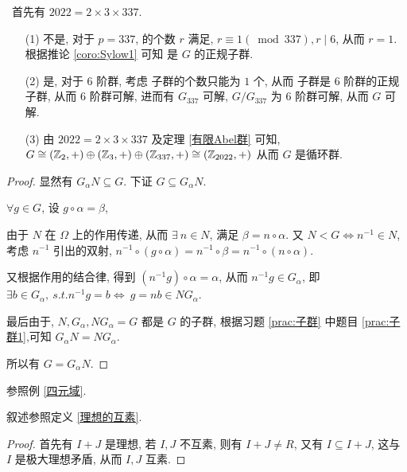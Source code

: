 \problem[题目 6]

\begin{solution}\
	首先有 $2022=2\times 3\times 337$.
	\begin{itemize}
		\item[(1)]不是, 对于 $p=337$, \Sy[337] 的个数 $r$ 满足, $r\equiv 1(\bmod 337),r\mid 6$, 从而 $r=1$. 根据推论 \ref{coro:Sylow1} 可知 \Sy[337] 是 $G$ 的正规子群.
		\item[(2)]是, 对于 $6$ 阶群, 考虑 \Sy[3] 子群的个数只能为 $1$ 个, 从而 \Sy[3] 子群是 $6$ 阶群的正规子群, 从而 $6$ 阶群可解, 进而有 $G_{337}$ 可解, $G/G_{337}$ 为 $6$ 阶群可解, 从而 $G$ 可解.
		\item[(3)] 由 $2022=2\times 3\times 337$ 及定理 \ref{有限Abel群} 可知, $G\cong (\mathbb Z_2,+)\oplus(\mathbb Z_3,+)\oplus(\mathbb Z_{337},+)\cong(\mathbb Z_{2022},+)$ 从而 $G$ 是循环群.
	\end{itemize}

\end{solution}


\problem[题目 7]

\begin{proof}
	显然有 $G_\alpha N\subseteq G$. 下证 $G\subseteq G_\alpha N$.

	$\forall g\in G$, 设 $g\circ \alpha = \beta$,

	由于 $N$ 在 $\Omega$ 上的作用传递, 从而 $\exists\ n\in N$, 满足 $\beta=n\circ \alpha$. 又 $N<G\Leftrightarrow n^{-1}\in N$, 考虑 $n^{-1}$ 引出的双射, $n^{-1}\circ(g\circ \alpha)=n^{-1}\circ \beta=n^{-1}\circ(n\circ \alpha)$.

	又根据作用的结合律, 得到 $(n^{-1}g)\circ \alpha=\alpha$, 从而 $n^{-1}g\in G_\alpha$, 即 $\exists b\in G_\alpha,\ s.t. n^{-1}g=b\Leftrightarrow\ g=nb\in  NG_\alpha$.

	最后由于, $N,G_\alpha,NG_\alpha=G$ 都是 $G$ 的子群, 根据习题 \ref{prac:子群} 中题目 \ref{prac:子群1},可知 $G_\alpha N=N G_\alpha$.

	所以有 $G=G_\alpha N$.

\end{proof}

\problem[题目 8]

\begin{solution}
	参照例 \ref{四元域}.
\end{solution}

\problem[题目 9]

叙述参照定义 \ref{理想的互素}.

\begin{proof}
	首先有 $I+J$ 是理想, 若 $I,J$ 不互素, 则有 $I+J\neq R$, 又有 $I\subseteq I+J$, 这与 $I$ 是极大理想矛盾, 从而 $I,J$ 互素.
\end{proof}

